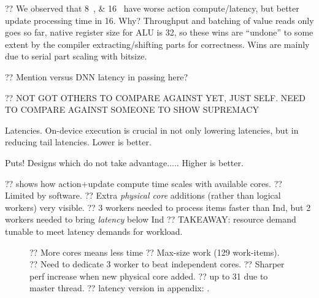 \documentclass[sigconf,natbib=false]{acmart}
\newcommand{\Indfw}{Ind}
\begin{document}
?? We observed that \SIlist{8;16}{\bit} have worse action compute/latency, but better update processing time in \SI{16}{\bit}. Why? Throughput and batching of value reads only goes so far, native register size for ALU is \SI{32}{\bit}, so these wins are ``undone'' to some extent by the compiler extracting/shifting parts  for correctness. Wins are mainly due to serial part scaling with bitsize.

?? Mention versus DNN latency in passing here?

?? NOT GOT OTHERS TO COMPARE AGAINST YET, JUST SELF. NEED TO COMPARE AGAINST SOMEONE TO SHOW SUPREMACY

\begin{table}
	\caption{Latencies. On-device execution is crucial in not only lowering latencies, but in reducing tail latencies. Lower is better.\label{tab:lats}}
\end{table}

\begin{table}
	\caption{Puts! Designs which do not take advantage..... Higher is better.\label{tab:tputs}}
\end{table}

??  shows how action+update compute time scales with available cores.
?? Limited by software.
?? Extra \emph{physical core} additions (rather than logical workers) very visible.
?? 3 workers needed to process items faster than \Indfw{}, but 2 workers needed to bring \emph{latency} below \Indfw{}
?? TAKEAWAY: resource demand tunable to meet latency demands for workload.

\begin{figure}
	\caption{?? More cores means less time ?? Max-size work (129 work-items). ?? Need to dedicate 3 worker to beat independent cores. ?? Sharper perf increase when new physical core added. ?? up to 31 due to master thread. ?? latency version in appendix: .\label{fig:vary-core}}
\end{figure}
\end{document}
